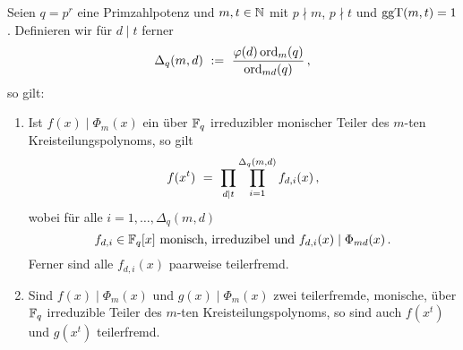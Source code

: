 \begin{satz}
  \label{satz:zerfall_f_x_s}
  Seien $q=p^r$ eine Primzahlpotenz und
  $m,t\in \mathbb{N}$ mit $p\nmid m$, $p\nmid t$ und $\operatorname{ggT}(m,t) = 1$.
  Definieren wir für $d\mid t$ ferner
  \[ \Delta_q(m,d) \ :=\  \frac{\varphi(d) \operatorname{ord}_m(q)}{\operatorname{ord}_{md}(q)}\,,\]
  so gilt:
  \begin{enumerate}
    \item Ist $f(x) \mid \Phi_m(x)$ ein über $\mathbb{F}_q$ irreduzibler monischer Teiler des
      $m$-ten Kreisteilungspolynoms, so gilt
      \[ f(x^t) \ =\  \prod_{d\mid t} 
        \prod_{i=1}^{\Delta_q(m,d)} f_{d,i}(x)\,,\]
      wobei für alle $i=1,\ldots,\Delta_q(m,d)$ 
      \[ f_{d,i}\in \mathbb{F}_q[x] 
        \text{ monisch, irreduzibel und } f_{d,i}(x) \mid \Phi_{md}(x)\,.\]
      Ferner sind alle $f_{d,i}(x)$ paarweise teilerfremd.
    \item Sind $f(x) \mid \Phi_m(x)$ und $g(x) \mid \Phi_m(x)$ zwei
      teilerfremde, monische, über $\mathbb{F}_q$ irreduzible Teiler des $m$-ten
      Kreisteilungspolynoms, so sind auch $f(x^t)$ und $g(x^t)$ teilerfremd.
  \end{enumerate}
\end{satz}

